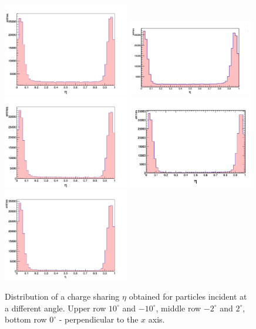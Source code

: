 \begin{figure}[bph]
\begin{center}
\includegraphics[width = 0.49\textwidth]{figures/eta/eta_1d_10.png} 
\includegraphics[width = 0.49\textwidth]{figures/eta/eta_1d_neg10.png}
\includegraphics[width = 0.49\textwidth]{figures/eta/eta_1d_2.png} 
\includegraphics[width = 0.49\textwidth]{figures/eta/eta_1d_neg2.png} 
\includegraphics[width = 0.49\textwidth]{figures/eta/eta_1d_0.png} 

\caption{Distribution of a charge sharing $\eta$ obtained for particles incident at a different angle. Upper row $10^{\circ}$ and $-10^{\circ}$, middle row $-2^{\circ}$ and $2^{\circ}$, bottom row $0^{\circ}$ - perpendicular to the $x$ axis.    }
\label{fig:eta_distribution}
 \end{center}
 \end{figure}
 
